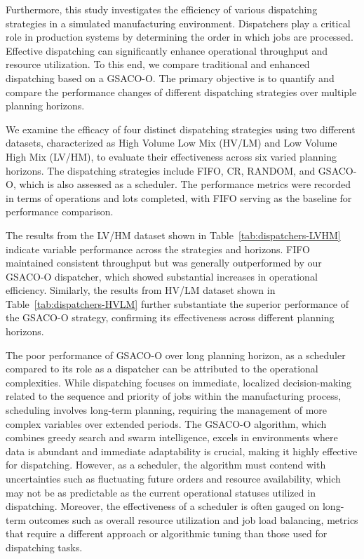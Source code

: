 Furthermore, this study investigates the efficiency of various dispatching strategies in a simulated manufacturing environment. Dispatchers play a critical role in production systems by determining the order in which jobs are processed. Effective dispatching can significantly enhance operational throughput and resource utilization. To this end, we compare traditional and enhanced dispatching based on a GSACO-O. The primary objective is to quantify and compare the performance changes of different dispatching strategies over multiple planning horizons.

We examine the efficacy of four distinct dispatching strategies using two different datasets, characterized as High Volume Low Mix (HV/LM) and Low Volume High Mix (LV/HM), to evaluate their effectiveness across six varied planning horizons. The dispatching strategies include FIFO, CR, RANDOM, and GSACO-O, which is also assessed as a scheduler. The performance metrics were recorded in terms of operations and lots completed, with FIFO serving as the baseline for performance comparison.

The results from the LV/HM dataset shown in Table~\ref{tab:dispatchers-LVHM} indicate variable performance across the strategies and horizons. FIFO maintained consistent throughput but was generally outperformed by our GSACO-O dispatcher, which showed substantial increases in operational efficiency. Similarly, the results from HV/LM dataset shown in Table~\ref{tab:dispatchers-HVLM} further substantiate the superior performance of the GSACO-O strategy, confirming its effectiveness across different planning horizons.

The poor performance of GSACO-O over long planning horizon, as a scheduler compared to its role as a dispatcher can be attributed to the operational complexities. While dispatching focuses on immediate, localized decision-making related to the sequence and priority of jobs within the manufacturing process, scheduling involves long-term planning, requiring the management of more complex variables over extended periods. The GSACO-O algorithm, which combines greedy search and swarm intelligence, excels in environments where data is abundant and immediate adaptability is crucial, making it highly effective for dispatching. However, as a scheduler, the algorithm must contend with uncertainties such as fluctuating future orders and resource availability, which may not be as predictable as the current operational statuses utilized in dispatching. Moreover, the effectiveness of a scheduler is often gauged on long-term outcomes such as overall resource utilization and job load balancing, metrics that require a different approach or algorithmic tuning than those used for dispatching tasks.

